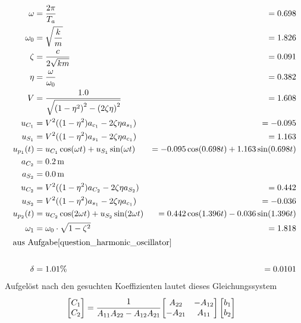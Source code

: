 \begin{solution}
\begin{align*}
            \omega &= \frac{2 \pi}{T_a} &= 0.698 \\
            \omega_0 &= \sqrt{\frac{k}{m}} &= 1.826\\
            \zeta &= \frac{c}{2 \sqrt{km}} &= 0.091\\
            \eta &= \frac{\omega}{\omega_0} &= 0.382\\
            V &= \frac{1.0}{\sqrt{{(1-\eta^2)}^2 - {(2 \zeta \eta)}^2}} &= 1.608\\
            u_{C_1}  &= V^2 ((1-\eta^2) a_{c_1} - 2 \zeta \eta a_{s_1}) &= -0.095 \\ 
            u_{S_1} &= V^2 ((1-\eta^2) a_{s_1} - 2 \zeta \eta a_{c_1}) &= 1.163 \\  
            u_{p_1}(t) &= u_{C_1} \cos(\omega t) + u_{S_1} \sin(\omega t) &= -0.095 \cos(0.698 t) + 1.163 \sin(0.698 t)\\
            a_{C_2} &= \SI{0.2}{\meter} \\
            a_{S_2} &= \SI{0.0}{\meter} \\
            u_{C_2} &= V^2 ((1-\eta^2) a_{C_2} - 2 \zeta \eta a_{S_2}) &= 0.442\\
            u_{S_2} &= V^2 ((1-\eta^2) a_{s_1} - 2 \zeta \eta a_{c_1}) &= -0.036\\
            u_{p_2}(t) &= u_{C_2} \cos(2\omega t) + u_{S_2} \sin(2\omega t) &= 0.442 \cos(1.396t) -0.036 \sin(1.396 t) \\
            \omega_1 &= \omega_0 \cdot \sqrt{1 - \zeta^2} &= 1.818\\
            \intertext{aus Aufgabe\ref{question_harmonic_oscillator}} \\
            \delta &= 1.01 \% &= 0.0101\\
        \end{align*}
            Aufgelöst nach den gesuchten Koeffizienten lautet dieses Gleichungssystem
    \begin{align*}
        &\begin{bmatrix}
            C_1 \\
            C_2
        \end{bmatrix}
        = \cfrac{1}{A_{11}A_{22}-A_{12}A_{21}}
        \begin{bmatrix}
            A_{22} & -A_{12}\\
            -A_{21} & A_{11}
        \end{bmatrix}
        \begin{bmatrix}
            b_1 \\
            b_2

\end{bmatrix}
\end{align*}
\end{solution}
